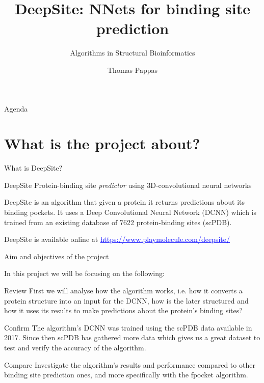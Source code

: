 \documentclass{beamer}
\newcommand{\link}[2]{\href{#1}{\textcolor{blue}{\underline{#2}}}}
\begin{document}
\title{DeepSite: NNets for binding site prediction}
\subtitle{Algorithms in Structural Bioinformatics}
\author{Thomas Pappas}
\maketitle

\begin{frame}{Agenda}
  \tableofcontents[hideallsubsections]
\end{frame}

\section{What is the project about?}

\begin{frame}{What is DeepSite?}
  \begin{block}{DeepSite}
    Protein-binding site \emph{predictor} using 3D-convolutional neural networks
  \end{block}
  \begin{block}{}
    DeepSite is an algorithm that given a protein it returns predictions about its binding pockets.
    It uses a Deep Convolutional Neural Network (DCNN) which is trained from an existing database of 7622 protein-binding sites (scPDB).
  \end{block}
  \begin{block}{}
      DeepSite is available online at \link{https://www.playmolecule.com/deepsite/}{https://www.playmolecule.com/deepsite/}
  \end{block}
\end{frame}

\begin{frame}{Aim and objectives of the project}
  \begin{block}{}
    In this project we will be focusing on the following:
  \end{block}
  \begin{block}{Review}
    First we will analyse how the algorithm works, i.e. how it converts a protein structure into an input for the DCNN, how is the later structured and how it uses its results to make predictions about the protein's binding sites?
  \end{block}
  \begin{block}{Confirm}
    The algorithm's DCNN was trained using the scPDB data available in 2017. Since then scPDB has gathered more data which gives us a great dataset to test and verify the accuracy of the algorithm.
  \end{block}
  \begin{block}{Compare}
    Investigate the algorithm's results and performance compared to other binding site prediction ones, and more specifically with the fpocket algorithm.
  \end{block}
\end{frame}
\end{document}

